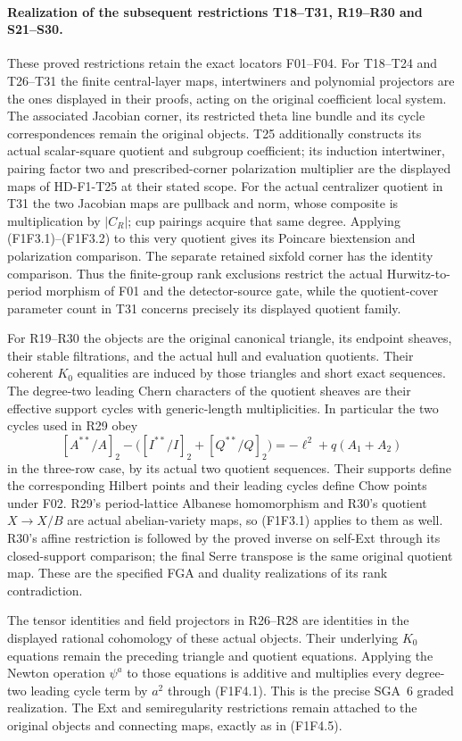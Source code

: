\paragraph{Realization of the subsequent restrictions T18--T31, R19--R30 and S21--S30.}
These proved restrictions retain the exact locators F01--F04.
For T18--T24 and T26--T31 the finite central-layer maps,
intertwiners and polynomial projectors are the ones displayed
in their proofs, acting on the original coefficient local system.
The associated Jacobian corner, its restricted theta line bundle
and its cycle correspondences remain the original objects.
T25 additionally constructs its actual scalar-square quotient
and subgroup coefficient; its induction intertwiner, pairing
factor two and prescribed-corner polarization multiplier are
the displayed maps of HD-F1-T25 at their stated scope.
For the actual centralizer quotient in T31 the two Jacobian maps
are pullback and norm, whose composite is multiplication by
$|C_R|$; cup pairings acquire that same degree. Applying
(F1F3.1)--(F1F3.2) to this very quotient gives its Poincare
biextension and polarization comparison. The separate retained
sixfold corner has the identity comparison. Thus the finite-group
rank exclusions restrict the actual Hurwitz-to-period morphism
of F01 and the detector-source gate, while the quotient-cover
parameter count in T31 concerns precisely its displayed quotient
family.

For R19--R30 the objects are the original canonical triangle,
its endpoint sheaves, their stable filtrations, and the actual
hull and evaluation quotients. Their coherent $K_0$ equalities
are induced by those triangles and short exact sequences.
The degree-two leading Chern characters of the quotient sheaves
are their effective support cycles with generic-length
multiplicities. In particular the two cycles used in R29 obey
\[
 [A^{**}/A]_2-
 \bigl([I^{**}/I]_2+[Q^{**}/Q]_2\bigr)
                 =-\ell^2+q(A_1+A_2)
\]
in the three-row case, by its actual two quotient sequences.
Their supports define the corresponding Hilbert points and their
leading cycles define Chow points under F02. R29's period-lattice
Albanese homomorphism and R30's quotient $X\to X/B$ are actual
abelian-variety maps, so (F1F3.1) applies to them as well.
R30's affine restriction is followed by the proved inverse on
self-Ext through its closed-support comparison; the final Serre
transpose is the same original quotient map. These are the
specified FGA and duality realizations of its rank contradiction.

The tensor identities and field projectors in R26--R28 are
identities in the displayed rational cohomology of these actual
objects. Their underlying $K_0$ equations remain the preceding
triangle and quotient equations. Applying the Newton operation
$\psi^a$ to those equations is additive and multiplies every
degree-two leading cycle term by $a^2$ through (F1F4.1).
This is the precise SGA~6 graded realization. The Ext and
semiregularity restrictions remain attached to the original
objects and connecting maps, exactly as in (F1F4.5).

